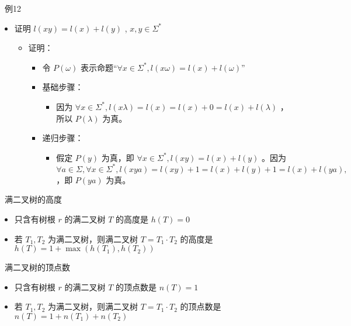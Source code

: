 \documentclass[UTF8]{report}
\theoremstyle{MyLineTheoremStyle} %
\theoremstyle{MyBlockTheoremStyle} %
\theoremstyle{MySubsubsectionStyle} %
\begin{document}
\textbullet\ 例12
\begin{itemize}
    \item 证明 $l(xy) = l(x) + l(y)$ , $x, y \in \Sigma^*$
    \begin{itemize}
        \item 证明：
        \begin{itemize}
            \item 令 $P(\omega)$ 表示命题“$\forall x \in \Sigma^*, l(x\omega) = l(x) + l(\omega)$”
            \item 基础步骤：
            \begin{itemize}
                \item 因为 $\forall x \in \Sigma^*, l(x\lambda) = l(x) = l(x) + 0 = l(x) + l(\lambda)$ ，所以 $P(\lambda)$ 为真。
            \end{itemize}
            \item 递归步骤：
            \begin{itemize}
                \item 假定 $P(y)$ 为真，即 $\forall x \in \Sigma^*, l(xy) = l(x) + l(y)$ 。因为 $\forall a \in \Sigma, \forall x \in \Sigma^*, l(xya) = l(xy) + 1 = l(x) + l(y) + 1 = l(x) + l(ya),$ ，即 $P(ya)$ 为真。
            \end{itemize}
        \end{itemize}
    \end{itemize}
\end{itemize}

\textbullet\ 满二叉树的高度
\begin{itemize}
    \item 只含有树根 $r$ 的满二叉树 $T$ 的高度是 $h(T) = 0$
    \item 若 $T_1, T_2$ 为满二叉树，则满二叉树 $T = T_1 \cdot T_2$ 的高度是 $h(T) = 1 + \max(h(T_1), h(T_2))$
\end{itemize}

\textbullet\ 满二叉树的顶点数
\begin{itemize}
    \item 只含有树根 $r$ 的满二叉树 $T$ 的顶点数是 $n(T) = 1$
    \item 若 $T_1, T_2$ 为满二叉树，则满二叉树 $T = T_1 \cdot T_2$ 的顶点数是 $n(T) = 1 + n(T_1) + n(T_2)$
\end{itemize}
\end{document}

